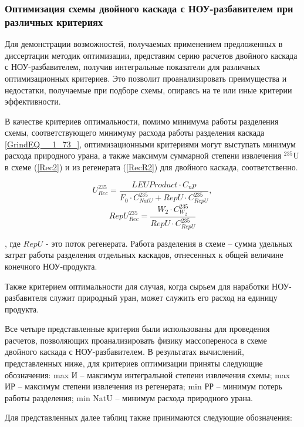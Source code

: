 \subsubsection{Оптимизация схемы двойного каскада с НОУ-разбавителем при различных критериях}

Для демонстрации возможностей, получаемых применением предложенных в диссертации методик оптимизации, представим серию расчетов двойного каскада с НОУ-разбавителем, получив интегральные показатели для различных оптимизационных критериев. Это позволит проанализировать преимущества и недостатки, получаемые при подборе схемы, опираясь на те или иные критерии эффективности.

В качестве критериев оптимальности, помимо минимума работы разделения схемы, соответствующего минимуму расхода работы разделения каскада \ref{GrindEQ__1_73_}, оптимизационными критериями могут выступать минимум расхода природного урана, а также максимум суммарной степени извлечения $^{235}$U в схеме (\ref{Rec2}) и из регенерата (\ref{RecR2}) для двойного каскада, соответственно.

\begin{equation} \label{Rec2} 
    U^{235}_{Rec} = \frac{LEU Product \cdot C_np}{F_0 \cdot C_{NatU}^{235} + RepU \cdot C_{RepU}^{235}}, 
\end{equation} 
\begin{equation} \label{RecR2} 
    RepU^{235}_{Rec} = \frac{W_2\cdot C_{W_2}^{235}}{RepU \cdot C_{RepU}^{235}}        
\end{equation} 

, где $RepU$ - это поток регенерата.
Работа разделения в схеме -- сумма удельных затрат работы разделения отдельных каскадов, отнесенных к общей величине конечного НОУ-продукта.

Также критерием оптимальности для случая, когда сырьем для наработки НОУ-разбавителя служит природный уран, может служить его расход на единицу продукта.

Все четыре представленные критерия были использованы для проведения расчетов, позволяющих проанализировать физику массопереноса в схеме двойного каскада с НОУ-разбавителем. В результатах вычислений, представленных ниже, для критериев оптимизации приняты следующие обозначения: max И -- максимум интегральной степени извлечения схемы; max ИР -- максимум степени извлечения из регенерата; min РР -- минимум потерь работы разделения; min NatU -- минимум расхода природного урана.

Для представленных далее таблиц также принимаются следующие обозначения:

